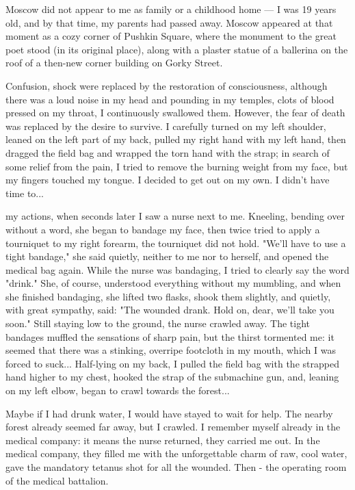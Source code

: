 \label{10-2}
  Moscow did not appear to me as family or a childhood home — I was 19 years old, and by that time, my parents had passed away. Moscow appeared at that moment as a cozy corner of Pushkin Square, where the monument to the great poet stood (in its original place), along with a plaster statue of a ballerina on the roof of a then-new corner building on Gorky Street.

\label{10-3}
Confusion, shock were replaced by the restoration of consciousness, although there was a loud noise in my head and pounding in my temples, clots of blood pressed on my throat, I continuously swallowed them. However, the fear of death was replaced by the desire to survive. I carefully turned on my left shoulder, leaned on the left part of my back, pulled my right hand with my left hand, then dragged the field bag and wrapped the torn hand with the strap; in search of some relief from the pain, I tried to remove the burning weight from my face, but my fingers touched my tongue. I decided to get out on my own. I didn't have time to...

\label{11-1}
my actions, when seconds later I saw a nurse next to me. Kneeling, bending over without a word, she began to bandage my face, then twice tried to apply a tourniquet to my right forearm, the tourniquet did not hold. "We'll have to use a tight bandage," she said quietly, neither to me nor to herself, and opened the medical bag again. While the nurse was bandaging, I tried to clearly say the word "drink." She, of course, understood everything without my mumbling, and when she finished bandaging, she lifted two flasks, shook them slightly, and quietly, with great sympathy, said: "The wounded drank. Hold on, dear, we'll take you soon." Still staying low to the ground, the nurse crawled away. The tight bandages muffled the sensations of sharp pain, but the thirst tormented me: it seemed that there was a stinking, overripe footcloth in my mouth, which I was forced to suck... Half-lying on my back, I pulled the field bag with the strapped hand higher to my chest, hooked the strap of the submachine gun, and, leaning on my left elbow, began to crawl towards the forest...

\label{12-1}
Maybe if I had drunk water, I would have stayed to wait for help. The nearby forest already seemed far away, but I crawled. I remember myself already in the medical company: it means the nurse returned, they carried me out. In the medical company, they filled me with the unforgettable charm of raw, cool water, gave the mandatory tetanus shot for all the wounded. Then - the operating room of the medical battalion.

